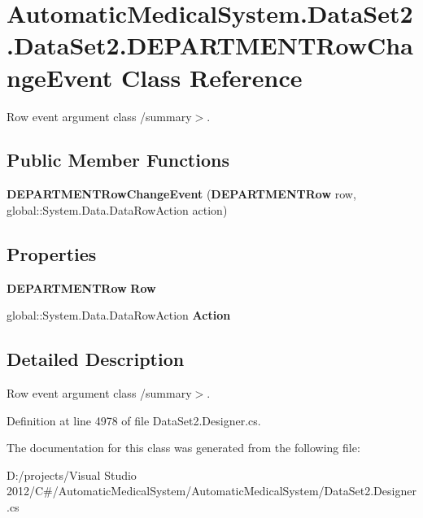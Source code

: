\section{AutomaticMedicalSystem.DataSet2.DataSet2.DEPARTMENTRowChangeEvent Class Reference}
\label{class_automatic_medical_system_1_1_data_set2_1_1_d_e_p_a_r_t_m_e_n_t_row_change_event}
Row event argument class /summary$>$.  


\subsection*{Public Member Functions}
\begin{CompactItemize}
\item 
\textbf{DEPARTMENTRowChangeEvent} ({\bf DEPARTMENTRow} row, global::System.Data.DataRowAction action)\label{class_automatic_medical_system_1_1_data_set2_1_1_d_e_p_a_r_t_m_e_n_t_row_change_event_76d79f49ab8754ebb4cac979afd774a6}

\end{CompactItemize}
\subsection*{Properties}
\begin{CompactItemize}
\item 
{\bf DEPARTMENTRow} \textbf{Row}\hspace{0.3cm}{\tt  [get]}\label{class_automatic_medical_system_1_1_data_set2_1_1_d_e_p_a_r_t_m_e_n_t_row_change_event_453b3c1a3461d4cb7ea73ba383300a30}

\item 
global::System.Data.DataRowAction \textbf{Action}\hspace{0.3cm}{\tt  [get]}\label{class_automatic_medical_system_1_1_data_set2_1_1_d_e_p_a_r_t_m_e_n_t_row_change_event_0eccdc3419fef36b963e09ba72a1c281}

\end{CompactItemize}


\subsection{Detailed Description}
Row event argument class /summary$>$. 

Definition at line 4978 of file DataSet2.Designer.cs.

The documentation for this class was generated from the following file:\begin{CompactItemize}
\item 
D:/projects/Visual Studio 2012/C\#/AutomaticMedicalSystem/AutomaticMedicalSystem/DataSet2.Designer.cs\end{CompactItemize}
